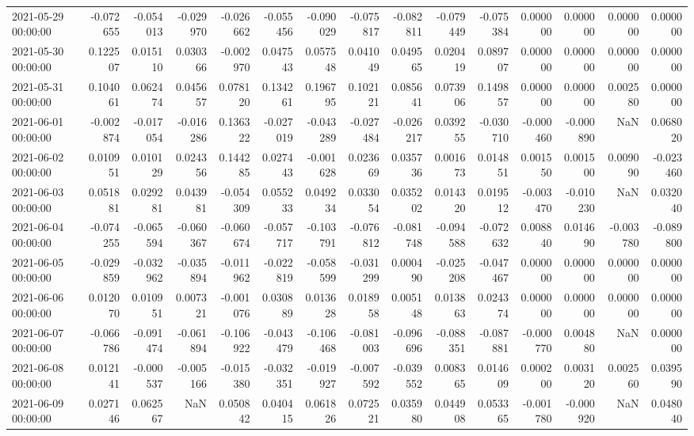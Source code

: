 \begin{tabular}{lrrrrrrrrrrrrrr}
2021-05-29 00:00:00 & -0.072655 & -0.054013 & -0.029970 & -0.026662 & -0.055456 & -0.090029 & -0.075817 & -0.082811 & -0.079449 & -0.075384 & 0.000000 & 0.000000 & 0.000000 & 0.000000 \\
2021-05-30 00:00:00 & 0.122507 & 0.015110 & 0.030366 & -0.002970 & 0.047543 & 0.057548 & 0.041049 & 0.049565 & 0.020419 & 0.089707 & 0.000000 & 0.000000 & 0.000000 & 0.000000 \\
2021-05-31 00:00:00 & 0.104061 & 0.062474 & 0.045657 & 0.078120 & 0.134261 & 0.196795 & 0.102121 & 0.085641 & 0.073906 & 0.149857 & 0.000000 & 0.000000 & 0.002580 & 0.000000 \\
2021-06-01 00:00:00 & -0.002874 & -0.017054 & -0.016286 & 0.136322 & -0.027019 & -0.043289 & -0.027484 & -0.026217 & 0.039255 & -0.030710 & -0.000460 & -0.000890 & NaN & 0.068020 \\
2021-06-02 00:00:00 & 0.010951 & 0.010129 & 0.024356 & 0.144285 & 0.027443 & -0.001628 & 0.023669 & 0.035736 & 0.001673 & 0.014851 & 0.001550 & 0.001500 & 0.009090 & -0.023460 \\
2021-06-03 00:00:00 & 0.051881 & 0.029281 & 0.043981 & -0.054309 & 0.055233 & 0.049234 & 0.033054 & 0.035202 & 0.014320 & 0.019512 & -0.003470 & -0.010230 & NaN & 0.032040 \\
2021-06-04 00:00:00 & -0.074255 & -0.065594 & -0.060367 & -0.060674 & -0.057717 & -0.103791 & -0.076812 & -0.081748 & -0.094588 & -0.072632 & 0.008840 & 0.014690 & -0.003780 & -0.089800 \\
2021-06-05 00:00:00 & -0.029859 & -0.032962 & -0.035894 & -0.011962 & -0.022819 & -0.058599 & -0.031299 & 0.000490 & -0.025208 & -0.047467 & 0.000000 & 0.000000 & 0.000000 & 0.000000 \\
2021-06-06 00:00:00 & 0.012070 & 0.010951 & 0.007321 & -0.001076 & 0.030889 & 0.013628 & 0.018958 & 0.005148 & 0.013863 & 0.024374 & 0.000000 & 0.000000 & 0.000000 & 0.000000 \\
2021-06-07 00:00:00 & -0.066786 & -0.091474 & -0.061894 & -0.106922 & -0.043479 & -0.106468 & -0.081003 & -0.096696 & -0.088351 & -0.087881 & -0.000770 & 0.004880 & NaN & 0.000000 \\
2021-06-08 00:00:00 & 0.012141 & -0.000537 & -0.005166 & -0.015380 & -0.032351 & -0.019927 & -0.007592 & -0.039552 & 0.008365 & 0.014609 & 0.000200 & 0.003120 & 0.002560 & 0.039590 \\
2021-06-09 00:00:00 & 0.027146 & 0.062567 & NaN & 0.050842 & 0.040415 & 0.061826 & 0.072521 & 0.035980 & 0.044908 & 0.053365 & -0.001780 & -0.000920 & NaN & 0.048040 \\

\end{tabular}
